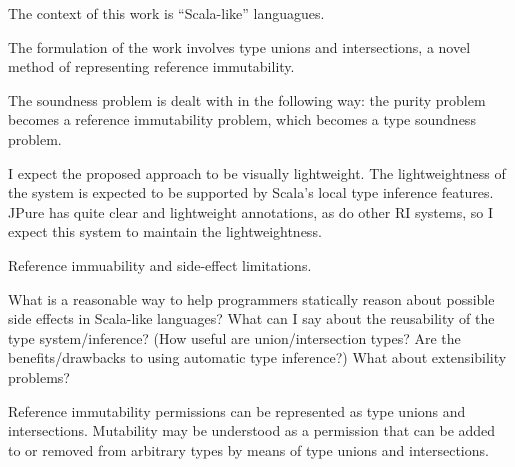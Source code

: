 \documentclass[letterpaper,11pt]{article}
\theoremstyle{definition}
\theoremstyle{remark}
\begin{document}


The context of this work is ``Scala-like'' languagues.

The formulation of the work involves type unions and intersections, a novel method of representing reference immutability.

The soundness problem is dealt with in the following way:
the purity problem becomes a reference immutability problem,
which becomes a type soundness problem.

I expect the proposed approach to be visually lightweight.
The lightweightness of the system is expected to be supported by Scala's local type inference features.
JPure has quite clear and lightweight annotations, as do other RI systems, so I expect this system to maintain the lightweightness.




Reference immuability and side-effect limitations.

What is a reasonable way to help programmers statically reason about possible side effects in Scala-like languages?
What can I say about the reusability of the type system/inference? (How useful are union/intersection types? Are the benefits/drawbacks to using automatic type inference?) What about extensibility problems?

Reference immutability permissions can be represented as type unions and intersections.
Mutability may be understood as a permission that can be added to or removed from arbitrary types by means of type unions and intersections.




\end{document}
